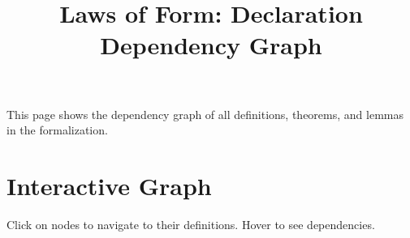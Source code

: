 \documentclass{report}
\begin{document}
\title{Laws of Form: Declaration Dependency Graph}
\maketitle

This page shows the dependency graph of all definitions, theorems, and lemmas in the formalization.

\section*{Interactive Graph}

Click on nodes to navigate to their definitions. Hover to see dependencies.

\begin{depgraph}

\end{depgraph}
\end{document}
